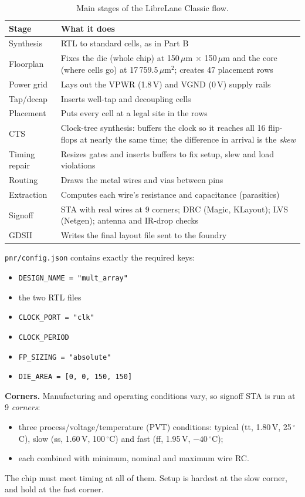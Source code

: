 \documentclass[10pt,a4paper,twocolumn]{article}
\newcommand{\umsq}{\,$\mu$m$^2$}
\begin{document}
\begin{table}[!htbp]
\centering\footnotesize
\begin{tabularx}{\columnwidth}{>{\raggedright\arraybackslash}p{2.0cm}L}
\toprule
\textbf{Stage} & \textbf{What it does} \\
\midrule
Synthesis & RTL to standard cells, as in Part B \\
Floorplan & Fixes the die (whole chip) at 150\,$\mu$m $\times$ 150\,$\mu$m and the core (where cells go) at 17\,759.5\umsq; creates 47 placement rows \\
Power grid & Lays out the VPWR (1.8\,V) and VGND (0\,V) supply rails \\
Tap/decap & Inserts well-tap and decoupling cells \\
Placement & Puts every cell at a legal site in the rows \\
CTS & Clock-tree synthesis: buffers the clock so it reaches all 16 flip-flops at nearly the same time; the difference in arrival is the \emph{skew} \\
Timing repair & Resizes gates and inserts buffers to fix setup, slew and load violations \\
Routing & Draws the metal wires and vias between pins \\
Extraction & Computes each wire's resistance and capacitance (parasitics) \\
Signoff & STA with real wires at 9 corners; DRC (Magic, KLayout); LVS (Netgen); antenna and IR-drop checks \\
GDSII & Writes the final layout file sent to the foundry \\
\bottomrule
\end{tabularx}
\caption{Main stages of the LibreLane Classic flow.}
\label{tab:flow}
\end{table}

\texttt{pnr/config.json} contains exactly the required keys:
\begin{itemize}
  \item \texttt{DESIGN\_NAME = "mult\_array"}
  \item the two RTL files
  \item \texttt{CLOCK\_PORT = "clk"}
  \item \texttt{CLOCK\_PERIOD}
  \item \texttt{FP\_SIZING = "absolute"}
  \item \texttt{DIE\_AREA = [0, 0, 150, 150]}
\end{itemize}

\textbf{Corners.} Manufacturing and operating conditions vary, so signoff STA is run at 9 \emph{corners}:
\begin{itemize}
  \item three process/voltage/temperature (PVT) conditions: typical (tt, 1.80\,V, 25\,$^\circ$C), slow (ss, 1.60\,V, 100\,$^\circ$C) and fast (ff, 1.95\,V, $-40$\,$^\circ$C);
  \item each combined with minimum, nominal and maximum wire RC.
\end{itemize}
The chip must meet timing at all of them. Setup is hardest at the slow corner, and hold at the fast corner.
\end{document}
